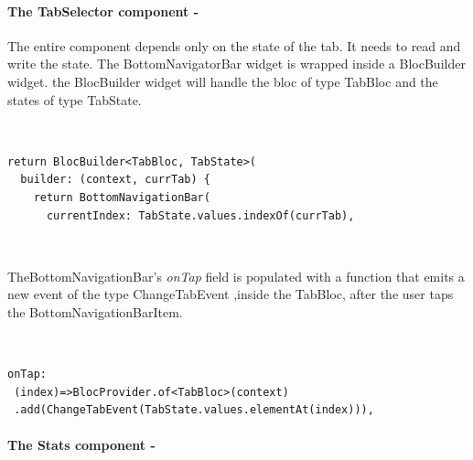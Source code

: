 \paragraph{The TabSelector component - }
\label{subpar:todo_app_bloc_core_state}

The entire component depends only on the state of the tab. It needs to read and write the state. The BottomNavigatorBar widget is wrapped inside a BlocBuilder widget. the BlocBuilder widget will handle the bloc of type TabBloc and the states of type TabState.
\begin{code}
\mbox{}\\
 \mbox{}
\label{code:2.14}
\begin{verbatim}
return BlocBuilder<TabBloc, TabState>(
  builder: (context, currTab) {
    return BottomNavigationBar(
      currentIndex: TabState.values.indexOf(currTab),
\end{verbatim}
\mbox{}\\
\end{code}
TheBottomNavigationBar’s \textit{onTap} field is populated with a function that emits a new event of the type ChangeTabEvent ,inside the TabBloc, after the user taps the BottomNavigationBarItem.
\begin{code}
\mbox{}\\
 \mbox{}
\label{code:2.14}
\begin{verbatim}
onTap:
 (index)=>BlocProvider.of<TabBloc>(context)
 .add(ChangeTabEvent(TabState.values.elementAt(index))),
\end{verbatim}
\mbox{}
\end{code}


\paragraph{The Stats component - }
\label{subpar:todo_app_bloc_core_state}

